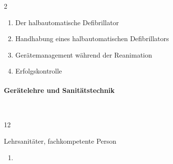 \begin{WidePar}
\begin{multicols}{2}
  \begin{enumerate}
    \item Der halbautomatische Defibrillator \dotfill {}
    \item Handhabung eines halbautomatischen Defibrillators \dotfill {}
    \item Gerätemanagement während der Reanimation \dotfill {}
    \item Erfolgskontrolle \dotfill {}
  \end{enumerate}

\paragraph{Gerätelehre und Sanitätstechnik }~
  
  \begin{inparadesc}
    \item[Stundenanzahl:]  12
    \item[Lehrkraft:]   Lehrsanitäter, fachkompetente Person
  \end{inparadesc}
  
  \begin{enumerate}\item
    

\end{enumerate}
\end{multicols}
\end{WidePar}
